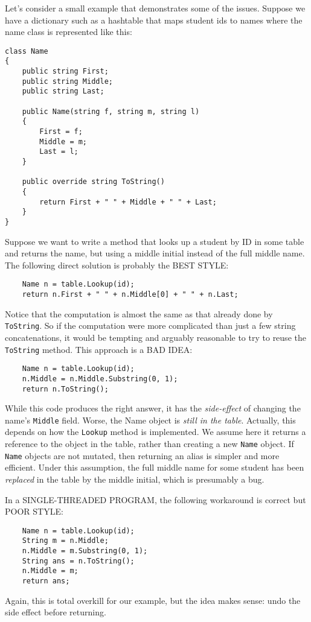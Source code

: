\documentclass[10pt]{article}
\begin{document}
Let's consider a small example that demonstrates some of the issues.
Suppose we have a dictionary such as a hashtable that maps student ids
to names where the name class is represented like this:
\begin{verbatim}
class Name
{
    public string First;
    public string Middle;
    public string Last;

    public Name(string f, string m, string l)
    {
        First = f;
        Middle = m;
        Last = l;
    }

    public override string ToString()
    {
        return First + " " + Middle + " " + Last;
    }
}
\end{verbatim}
Suppose we want to write a method that looks up a student by ID in 
some table and returns the name, but using a middle initial instead of
the full middle name.  The following direct solution is probably the
BEST STYLE:
\begin{verbatim}
    Name n = table.Lookup(id);
    return n.First + " " + n.Middle[0] + " " + n.Last;
\end{verbatim}
Notice that the computation is almost the same as that already done by
{\tt ToString}.  So if the computation were more complicated than just
a few string concatenations, it would be tempting and arguably
reasonable to try to reuse the {\tt ToString} method.  This approach
is a BAD IDEA:
\begin{verbatim}
    Name n = table.Lookup(id);
    n.Middle = n.Middle.Substring(0, 1);
    return n.ToString();
\end{verbatim}
While this code produces the right answer, it has the
\emph{side-effect} of changing the name's {\tt Middle} field.  Worse,
the Name object is \emph{still in the table}.  Actually, this depends on how the
{\tt Lookup} method is implemented.  We assume here it returns a
reference to the object in the table, rather than creating a new 
  {\tt Name} object.  If {\tt Name} objects are not mutated, then returning an
  alias is simpler and more efficient.  Under this assumption, the
  full middle name for some student has been \emph{replaced} in the
  table by the middle initial, which is presumably a bug.

In a SINGLE-THREADED PROGRAM, the following workaround is correct but
POOR STYLE:
\begin{verbatim}
    Name n = table.Lookup(id);
    String m = n.Middle;
    n.Middle = m.Substring(0, 1);
    String ans = n.ToString();
    n.Middle = m;
    return ans;
\end{verbatim}
Again, this is total overkill for our example, but the idea makes
sense: undo the side effect before returning.
\end{document}
